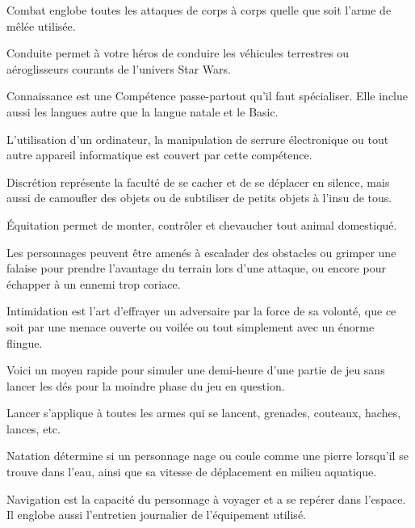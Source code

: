 
\begin{description}[align=left]
	\item [Combat (Agi)]
		Combat englobe toutes les attaques de corps	à corps quelle que soit l’arme de mêlée utilisée.
	\item [Conduite (Agi)]
		Conduite permet à votre héros de conduire les véhicules terrestres ou aéroglisseurs courants de l'univers Star Wars.
	\item [Connaissance (Int)]
		Connaissance est une Compétence passe-partout qu’il faut spécialiser. Elle inclue aussi les langues autre que la langue natale et le Basic.
	\item [Piratage (Int)]
		L'utilisation d'un ordinateur, la manipulation de serrure électronique ou tout autre appareil informatique est couvert par cette compétence.
	\item [Discrétion (Agi)]
		Discrétion représente la faculté de se cacher et de se déplacer en silence, mais aussi de camoufler des objets ou de subtiliser de petits objets à l’insu de tous.
	\item [Équitation (Agi)]
		Équitation permet de monter, contrôler et chevaucher tout animal domestiqué.
	\item [Escalade (For)]
		Les personnages peuvent être amenés à escalader des obstacles ou grimper une falaise pour prendre l'avantage du terrain lors d'une attaque, ou encore pour échapper à un ennemi trop coriace.
	\item [Intimidation (\^Ame)]
		Intimidation est l’art d’effrayer un adversaire par la force de sa volonté, que ce soit par une menace ouverte ou voilée ou tout simplement avec un énorme flingue.
	\item [Jeu (Int)]
		Voici un moyen rapide pour simuler une demi-heure d’une partie de jeu sans lancer les dés pour la moindre phase du jeu en question.
	\item [Lancer (Agi)]
		Lancer s’applique à toutes les armes qui se lancent, grenades, couteaux, haches, lances, etc.
	\item [Natation (Agi)]
		Natation détermine si un personnage nage ou coule comme une pierre lorsqu’il se trouve dans l’eau, ainsi que sa vitesse de déplacement en milieu aquatique.
	\item [Navigation (Int)]
		Navigation est la capacité du personnage à voyager et a se repérer dans l'espace. Il englobe aussi l'entretien journalier de l'équipement utilisé.

\end{description}
